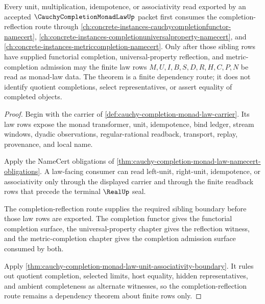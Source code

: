 \begin{theorem}
\label{thm:cauchy-completion-monad-law-completion-reflection-route}
Every unit, multiplication, idempotence, or associativity read exported by an accepted $\CauchyCompletionMonadLawUp$ packet first consumes the completion-reflection route through \autoref{ch:concrete-instances-cauchycompletionfunctor-namecert}, \autoref{ch:concrete-instances-completionuniversalproperty-namecert}, and \autoref{ch:concrete-instances-metriccompletion-namecert}. Only after those sibling rows have supplied functorial completion, universal-property reflection, and metric-completion admission may the finite law rows $M,U,I,B,S,D,R,H,C,P,N$ be read as monad-law data. The theorem is a finite dependency route; it does not identify quotient completions, select representatives, or assert equality of completed objects.
\end{theorem}
\begin{proof}
Begin with the carrier of \autoref{def:cauchy-completion-monad-law-carrier}. Its law rows expose the monad transformer, unit, idempotence, bind ledger, stream windows, dyadic observations, regular-rational readback, transport, replay, provenance, and local name.

Apply the NameCert obligations of \autoref{thm:cauchy-completion-monad-law-namecert-obligations}. A law-facing consumer can read left-unit, right-unit, idempotence, or associativity only through the displayed carrier and through the finite readback rows that precede the terminal $\RealUp$ seal.

The completion-reflection route supplies the required sibling boundary before those law rows are exported. The completion functor gives the functorial completion surface, the universal-property chapter gives the reflection witness, and the metric-completion chapter gives the completion admission surface consumed by both.

Apply \autoref{thm:cauchy-completion-monad-law-unit-associativity-boundary}. It rules out quotient completion, selected limits, host equality, hidden representatives, and ambient completeness as alternate witnesses, so the completion-reflection route remains a dependency theorem about finite rows only.
\end{proof}


